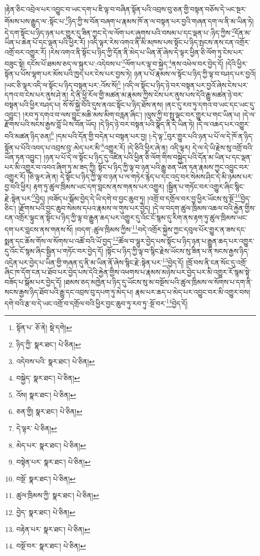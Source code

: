 །རྟེན་ཅིང་འབྲེལ་པར་འབྱུང་བ་ཡང་དག་པ་ཇི་ལྟ་བ་བཞིན་སྟོན་པའི་འབྲས་བུ་ཅན་གྱི་བསྟན་བཅོས་དེ་ཡང་སྔར་གོམས་པས་རྒྱུད་ལ་:སྟོང་པ་\footnote{སྟོན་པ་  ཅོ་ནེ།  སྡེ་དགེ། }ཉིད་ཀྱི་ས་བོན་བཞག་པ་རྣམས་ཁོ་ན་ལ་བསྟན་པར་བྱའི་གཞན་དག་ལ་ནི་མ་ཡིན་ཏེ། དེ་དག་སྟོང་པ་ཉིད་ཉན་པར་གྱུར་དུ་ཟིན་ཀྱང་དེ་ལ་ལོག་པར་ཞུགས་པའི་བསམ་པ་དང་ལྡན་པ་:ཉིད་ཀྱིས་\footnote{ཉིད་ཀྱི་  སྣར་ཐང་།  པེ་ཅིན། }དོན་མ་ཡིན་པ་ཆེན་པོ་དང་ལྡན་པའི་ཕྱིར་རོ། །འདི་ལྟར་རེས་འགའ་ནི་མི་མཁས་པས་སྟོང་པ་ཉིད་སྤངས་ནས་ངན་འགྲོར་འགྲོ་བར་འགྱུར་རོ། །རེས་འགའ་ནི་སྟོང་པ་ཉིད་ཀྱི་དོན་ནི་མེད་པ་ཡིན་ནོ་ཞེས་དེ་ལྟར་ཕྱིན་ཅི་ལོག་ཏུ་ངེས་པར་བཟུང་སྟེ། དངོས་པོ་ཐམས་ཅད་ལ་སྐུར་པ་:འདེབས་པ་\footnote{འདེབས་པའི་  སྣར་ཐང་།  པེ་ཅིན། }ལོག་པར་ལྟ་བ་སྐྱེད་\footnote{བསྐྱེད་  སྣར་ཐང་།  པེ་ཅིན། }ནས་འཕེལ་བར་བྱེད་དོ། །དེའི་ཕྱིར་སྟོན་པ་པོས་ལྷག་པར་མོས་པའི་ཁྱད་པར་ངེས་པར་བྱས་ཏེ། ཉན་པ་པོ་རྣམས་ལ་སྟོང་པ་ཉིད་ཀྱི་ལྟ་བ་བཤད་པར་བྱའོ། །ཡང་ཅི་ལྟར་འདི་ལ་སྟོང་པ་ཉིད་བསྟན་པར་:འོས་སོ།\footnote{འོས།  སྣར་ཐང་།  པེ་ཅིན། } །འདི་ལ་སྟོང་པ་ཉིད་ཉེ་བར་བསྟན་པར་བྱའོ་ཞེས་ངེས་པར་དཀའ་བ་ངེས་པར་ནུས་ཤེ་ན། དེ་ནི་ཕྱི་རོལ་གྱི་མཚན་མ་རྣམས་ཀྱིས་ངེས་པར་ནུས་པས་དེའི་རྒྱུ་མཚན་ཉེ་བར་བསྟན་པའི་ཕྱིར་བཤད་པ། སོ་སོ་སྐྱེ་བོའི་དུས་ནའང་སྟོང་པ་ཉིད་ཐོས་ནས། །ནང་དུ་རབ་ཏུ་དགའ་བ་ཡང་དང་ཡང་དུ་འབྱུང་། །རབ་ཏུ་དགའ་བ་ལས་བྱུང་མཆི་མས་མིག་བརླན་ཞིང་། །ལུས་ཀྱི་བ་སྤུ་ལྡང་བར་གྱུར་པ་གང་ཡིན་པ། །དེ་ལ་རྫོགས་པའི་སངས་རྒྱས་བློ་ཡི་ས་བོན་ཡོད། །དེ་ཉིད་ཉེ་བར་བསྟན་པའི་སྣོད་ནི་དེ་ཡིན་ཏེ། །དེ་ལ་འཆད་པར་འགྱུར་བའི་མཚན་ཉིད་ཅན།\footnote{ཅན་གྱི།  སྣར་ཐང་།  པེ་ཅིན། } །དམ་པའི་དོན་གྱི་བདེན་པ་བསྟན་པར་བྱ། །:དེ་ལྟ་\footnote{དེ་ལྟར་  པེ་ཅིན། }བུར་གྱུར་པའི་ཉན་པ་པོ་ལ་དེ་ཁོ་ན་ཉིད་སྟོན་པ་པོའི་འབད་པ་འབྲས་བུ་:མེད་པར་མི་\footnote{མེད་པར་  སྣར་ཐང་།  པེ་ཅིན། }འགྱུར་རོ། །དེ་ཅིའི་ཕྱིར་ཞེ་ན། འདི་ལྟར། དེ་ལ་དེ་ཡི་རྗེས་སུ་འགྲོ་བའི་ཡོན་ཏན་འབྱུང་། །ཉན་པ་པོ་དེ་ལ་སྟོང་པ་ཉིད་དུ་འཛིན་པའི་ཕྱིན་ཅི་ལོག་གིས་བསྐྱེད་པའི་དོན་མ་ཡིན་པ་དང་ལྡན་པར་མི་འགྱུར་བ་འབའ་ཞིག་ཏུ་མ་ཟད་ཀྱི། སྟོང་པ་ཉིད་ཀྱི་ལྟ་བ་ཉན་པའི་རྒྱུ་ཅན་ཡོན་ཏན་རྣམས་ཀྱང་འབྱུང་བར་འགྱུར་རོ། །ཅི་ལྟར་ཞེ་ན། དེ་སྟོང་པ་ཉིད་ཀྱི་ལྟ་བ་ཉན་པ་ལ་གཏེར་རྙེད་པ་དང་འདྲ་བར་སེམས་ཤིང་དེ་མི་ཉམས་པར་བྱ་བའི་ཕྱིར། རྟག་ཏུ་ཚུལ་ཁྲིམས་ཡང་དག་བླངས་ནས་གནས་པར་འགྱུར། །སྦྱིན་པ་གཏོང་བར་འགྱུར་ཞིང་སྙིང་རྗེ་:སྟེན་པར་\footnote{བསྟེན་པར་  སྣར་ཐང་།  པེ་ཅིན། }བྱེད། །བཟོད་པ་སྒོམ་བྱེད་དེ་ཡི་དགེ་བ་བྱང་ཆུབ་ཏུ། །འགྲོ་བ་དགྲོལ་བར་བྱ་ཕྱིར་ཡོངས་སུ་སྔོ་\footnote{བསྔོ་  སྣར་ཐང་།  པེ་ཅིན། }བྱེད་ཅིང་། །རྫོགས་པའི་བྱང་ཆུབ་སེམས་དཔའ་རྣམས་ལ་གུས་པར་བྱེད། །དེ་ལ་བདག་ཚུལ་ཁྲིམས་འཆལ་བའི་རྐྱེན་གྱིས་ངན་འགྲོར་ལྟུང་ན་སྟོང་པ་ཉིད་ཀྱི་ལྟ་བ་རྒྱུན་ཆད་པར་འགྱུར་དུ་འོང་ངོ་སྙམ་དུ་རིག་ནས་རྟག་ཏུ་ཚུལ་ཁྲིམས་ཡང་དག་པར་བླངས་ནས་གནས་སོ། །བདག་:ཚུལ་ཁྲིམས་ཀྱིས་\footnote{ཚུལ་ཁྲིམས་ཀྱི་  སྣར་ཐང་།  པེ་ཅིན། }བདེ་འགྲོར་སྐྱེས་ཀྱང་དབུལ་པོར་གྱུར་ན་ཟས་དང་སྨན་དང་ཆོས་གོས་ལ་སོགས་པ་འཚོ་བའི་ཡོ་བྱད་\footnote{བྱེད་  སྣར་ཐང་།  པེ་ཅིན། }ཚོལ་བ་ལྷུར་བྱེད་པས་སྟོང་པ་ཉིད་ཉན་པ་རྒྱུན་ཆད་པར་འགྱུར་དུ་འོང་ངོ་སྙམ་ཞིང་སྦྱིན་པ་གཏོང་བར་བྱེད་དོ། །སྟོང་པ་ཉིད་ཀྱི་ལྟ་བ་སྙིང་རྗེས་ཡོངས་སུ་ཟིན་པ་ནི་སངས་རྒྱས་ཉིད་འདྲེན་པར་བྱེད་པ་ཡིན་གྱི་གཞན་དུ་ནི་མ་ཡིན་ནོ་ཞེས་སྙིང་རྗེ་:སྟེན་པར་\footnote{བརྟེན་པར་  སྣར་ཐང་།  པེ་ཅིན། }བྱེད་དོ། །ཁྲོ་བས་ནི་ངན་སོང་དུ་འགྲོ་ཞིང་ཁ་དོག་ངན་པ་ཐོབ་པར་བྱེད་པས་དེའི་རྐྱེན་གྱིས་འཕགས་པ་རྣམས་མཉེས་པར་བྱེད་པར་མི་འགྱུར་རོ་སྙམ་སྟེ་བཟོད་པ་སྒོམ་པར་བྱེད་དོ། །ཐམས་ཅད་མཁྱེན་པ་ཉིད་དུ་ཡོངས་སུ་མ་བསྔོས་པའི་ཚུལ་ཁྲིམས་ལ་སོགས་པ་དག་ནི་སངས་རྒྱས་ཉིད་ཐོབ་པའི་རྒྱུ་དང་འབྲས་བུ་དཔག་ཏུ་མེད་པ། རྣམ་པར་ཆད་པ་མེད་པར་འབྱུང་བར་མི་འགྱུར་བས། དགེ་བའི་རྩ་བ་དེ་ཡང་འགྲོ་བ་དགྲོལ་བའི་ཕྱིར་བྱང་ཆུབ་ཏུ་རབ་ཏུ་:སྔོ་བར་\footnote{བསྔོ་བར་  སྣར་ཐང་།  པེ་ཅིན། }བྱེད་དོ། 